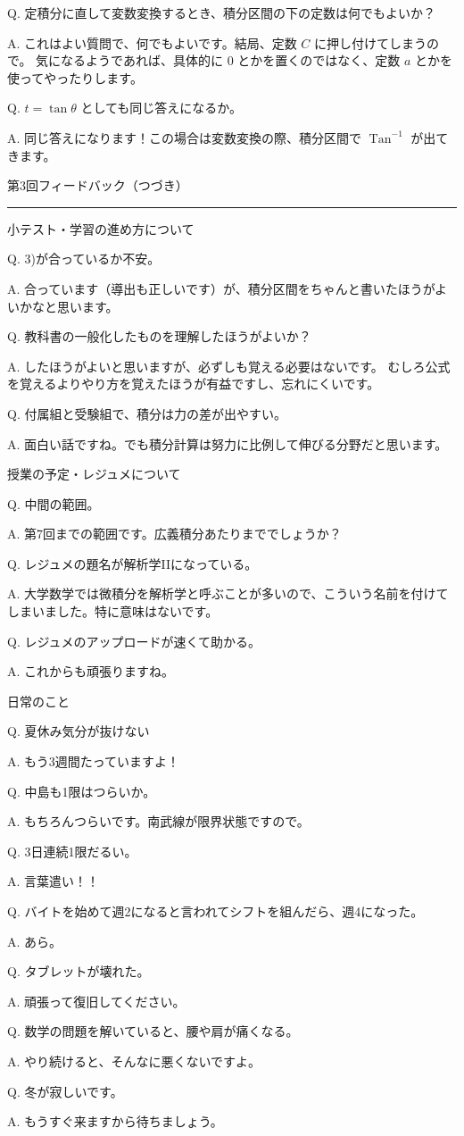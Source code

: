 \documentclass[a4paper,10pt,pdflatex,ja=standard,jafont=ipaex-type1,
  magstyle=real,scale=1]{bxjsarticle}
\newcommand{\handouttitle}[1]{%
  \begin{center}
    {\Large\color{ink}#1}\par\vspace{3mm}
    {\color{accent}\rule{0.88\linewidth}{0.7pt}}
  \end{center}\vspace{-2mm}}
\newcommand{\topic}[1]{\par\vspace{5pt}%
  {\large\sffamily\mdseries\color{accent}#1}\par\vspace{2pt}}
\newcommand{\feedback}[2]{%
  \par\addvspace{5pt}\noindent\begin{minipage}{\linewidth}%
  {\color{ink}Q. #1}\par\vspace{1pt}%
  {\color{accent}A. }#2%
  \end{minipage}\par}
\begin{document}
\feedback{定積分に直して変数変換するとき、積分区間の下の定数は何でもよいか？}{%
これはよい質問で、何でもよいです。結局、定数 $C$ に押し付けてしまうので。
気になるようであれば、具体的に $0$ とかを置くのではなく、定数 $a$ とかを使ってやったりします。
}

\feedback{$t=\tan\theta$ としても同じ答えになるか。}{%
同じ答えになります！この場合は変数変換の際、積分区間で $\operatorname{Tan}^{-1}$ が出てきます。
}

\newpage
\handouttitle{第3回\quad フィードバック（つづき）}

\topic{小テスト・学習の進め方について}

\feedback{3)が合っているか不安。}{%
合っています（導出も正しいです）が、積分区間をちゃんと書いたほうがよいかなと思います。
}

\feedback{教科書の一般化したものを理解したほうがよいか？}{%
したほうがよいと思いますが、必ずしも覚える必要はないです。
むしろ公式を覚えるよりやり方を覚えたほうが有益ですし、忘れにくいです。
}

\feedback{付属組と受験組で、積分は力の差が出やすい。}{%
面白い話ですね。でも積分計算は努力に比例して伸びる分野だと思います。
}

\topic{授業の予定・レジュメについて}

\feedback{中間の範囲。}{%
第7回までの範囲です。広義積分あたりまででしょうか？
}

\feedback{レジュメの題名が解析学IIになっている。}{%
大学数学では微積分を解析学と呼ぶことが多いので、こういう名前を付けてしまいました。特に意味はないです。
}

\feedback{レジュメのアップロードが速くて助かる。}{%
これからも頑張りますね。
}

\topic{日常のこと}

\feedback{夏休み気分が抜けない}{%
もう3週間たっていますよ！
}

\feedback{中島も1限はつらいか。}{%
もちろんつらいです。南武線が限界状態ですので。
}

\feedback{3日連続1限だるい。}{%
言葉遣い！！
}

\feedback{バイトを始めて週2になると言われてシフトを組んだら、週4になった。}{%
あら。
}

\feedback{タブレットが壊れた。}{%
頑張って復旧してください。
}

\feedback{数学の問題を解いていると、腰や肩が痛くなる。}{%
やり続けると、そんなに悪くないですよ。
}

\feedback{冬が寂しいです。}{%
もうすぐ来ますから待ちましょう。
}
\end{document}

